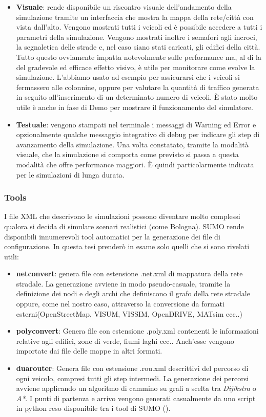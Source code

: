 \begin{itemize}
	\item \textbf{Visuale}: rende disponibile un riscontro visuale dell'andamento della simulazione tramite un interfaccia che mostra la mappa della rete/città con vista dall'alto. Vengono mostrati tutti i veicoli ed è possibile accedere a tutti i parametri della simulazione. Vengono mostrati inoltre i semafori agli incroci, la segnaletica delle strade e, nel caso siano stati caricati, gli edifici della città. Tutto questo ovviamente impatta notevolmente sulle performance ma, al di la del gradevole ed efficace effetto visivo, è utile per monitorare come evolve la simulazione. L'abbiamo usato ad esempio per assicurarsi che i veicoli si fermassero alle colonnine, oppure per valutare la quantità di traffico generata in seguito all'inserimento di un determinato numero di veicoli. È stato molto utile è anche in fase di Demo per mostrare il funzionamento del simulatore.
	\item \textbf{Testuale}: vengono stampati nel terminale i messaggi di Warning ed Error e opzionalmente qualche messaggio integrativo di debug per indicare gli step di avanzamento della simulazione. Una volta constatato, tramite la modalità visuale, che la simulazione si comporta come previsto si passa a questa modalità che offre performance maggiori. È quindi particolarmente indicata per le simulazioni di lunga durata.
\end{itemize}

\subsubsection{Tools}\label{sumo-tools}

I file XML che descrivono le simulazioni possono diventare molto complessi qualora si decida di simulare scenari realistici (come Bologna). SUMO rende disponibili innumerevoli tool automatici per la generazione dei file di configurazione. In questa tesi prenderò in esame solo quelli che si sono rivelati utili:

\begin{itemize}
 	\item \textbf{netconvert}: genera file con estensione .net.xml di mappatura della rete stradale. La generazione avviene in modo pseudo-casuale, tramite la definizione dei nodi e degli archi che definiscono il grafo della rete stradale oppure, come nel nostro caso, attraverso la conversione da formati esterni(OpenStreetMap, VISUM, VISSIM, OpenDRIVE, MATsim ecc..)
 	\item \textbf{polyconvert}: Genera file con estensione .poly.xml contenenti le informazioni relative agli edifici, zone di verde, fiumi laghi ecc.. Anch'esse vengono importate dai file delle mappe in altri formati.
 	 \item \textbf{duarouter}: Genera file con estensione .rou.xml descrittivi del percorso di ogni veicolo, compresi tutti gli step intermedi. La generazione dei percorsi avviene applicando un algoritmo di cammino su grafi a scelta tra \emph{Dijikstra} o \emph{A*}. I punti di partenza e arrivo vengono generati casualmente da uno script in python reso disponibile tra i tool di SUMO ().
\end{itemize}

